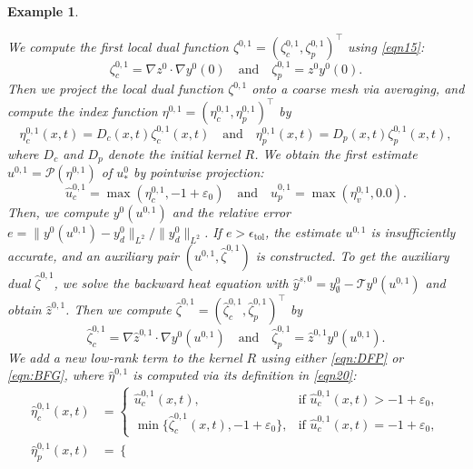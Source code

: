 \documentclass[onefignum,onetabnum]{siamart190516}
\newtheorem{example}{Example}[section]
\numberwithin{equation}{section}
\begin{document}
\begin{example}
\begin{itemize}
We compute the first local dual function $\zeta^{0,1} = (\zeta_c^{0,1}, \zeta_p^{0,1})^\top$  using \eqref{eqn15}:
\begin{equation*}
\zeta_c^{0,1} = \nabla z^0 \cdot \nabla y^0(0)\quad\text{and}\quad
\zeta_p^{0,1} =  z^0 y^0(0).
\end{equation*}
Then we project the local dual function $\zeta^{0,1}$  onto a coarse mesh via averaging, and compute
the index function $\eta^{0,1} = (\eta_c^{0,1}, \eta_p^{0,1})^\top$ by
\begin{equation}\label{eqn19}
\eta_c^{0,1}(x,t) = D_c(x,t) \zeta_c^{0,1}(x,t)\quad\text{and}\quad
\eta_p^{0,1}(x,t) = D_p(x,t) \zeta_p^{0,1}(x,t),
\end{equation}
where $D_c$ and $D_p$ denote the initial kernel $R$.
We obtain the first estimate $u^{0,1} = \mathcal{P}(\eta^{0,1})$ of $u_*^0$ by pointwise projection:
\begin{equation*}
\hat{u}_c^{0,1} = \max(\eta_c^{0,1}, -1 + \varepsilon_0)\quad\text{and}\quad
\hat{u}_p^{0,1} = \max(\eta_v^{0,1}, 0.0).
\end{equation*}
Then, we compute $y^0(u^{0,1})$ and the relative error $e = {\|y^0(u^{0,1}) - y_{d}^0\|_{L^2}}/{\|y_{d}^0\|_{L^2}}$.
If $ e > \epsilon_{\text{tol}}$, the estimate $u^{0,1}$ is insufficiently accurate, and an auxiliary pair $(u^{0,1}, \hat{\zeta}^{0,1})$ is constructed.
To get the auxiliary dual $\hat{\zeta}^{0,1}$, we solve the backward heat equation with $\hat{y}^{s,0} = y_{\emptyset}^0 - \mathcal{T} y^0(u^{0,1})$ and obtain $\hat{z}^{0,1}$.
Then we compute $\hat{\zeta}^{0,1} = (\hat{\zeta}_c^{0,1}, \hat{\zeta}_p^{0,1})^\top$ by
\begin{equation*}
\hat{\zeta}_c^{0,1} = \nabla \hat{z}^{0,1} \cdot \nabla y^0(u^{0,1})\quad\text{and}\quad
\hat{\zeta}_p^{0,1} = \hat{z}^{0,1} y^0(u^{0,1}).
\end{equation*}
We add a new low-rank term to the  kernel $R$ using either \eqref{eqn:DFP} or \eqref{eqn:BFG}, where $\hat{\eta}^{0,1}$ is computed via its definition in \eqref{eqn20}:
\begin{align*}
\hat{\eta}_{c}^{0,1}(x,t) &= \begin{cases}
\hat{u}_{c}^{0,1}(x,t), & \text{if } \hat{u}_{c}^{0,1}(x,t) > -1 + \varepsilon_{0}, \\
\min\{\hat{\zeta}_{c}^{0,1}(x,t), -1 + \varepsilon_{0}\}, & \text{if } \hat{u}_{c}^{0,1}(x,t) = -1 + \varepsilon_{0},
\end{cases} \\
\hat{\eta}_p^{0,1}(x,t) &= \begin{cases}

\end{cases}
\end{align*}
\end{itemize}
\end{example}
\end{document}
